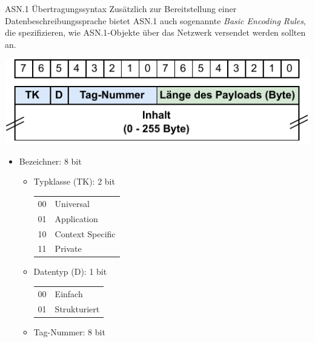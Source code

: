 \begin{defi}{ASN.1 Übertragungssyntax}
    Zusätzlich zur Bereitstellung einer Datenbeschreibungssprache bietet ASN.1 auch sogenannte \emph{Basic Encoding Rules}, die spezifizieren, wie ASN.1-Objekte über das Netzwerk versendet werden sollten an.
    
    \includegraphics[width=\textwidth]{includes/figures/defi_asn1.pdf}
    
    \begin{itemize}
        \item Bezeichner: 8 bit
              
              \begin{itemize}
                  \item Typklasse (TK): 2 bit
                        
                        \begin{tabular}{T|l}
                            00 & Universal        \\
                            01 & Application      \\
                            10 & Context Specific \\
                            11 & Private
                        \end{tabular}
                  \item Datentyp (D): 1 bit
                        
                        \begin{tabular}{T|l}
                            00 & Einfach      \\
                            01 & Strukturiert
                        \end{tabular}
                  \item Tag-Nummer: 8 bit
                        

\end{itemize}
\end{itemize}
\end{defi}

